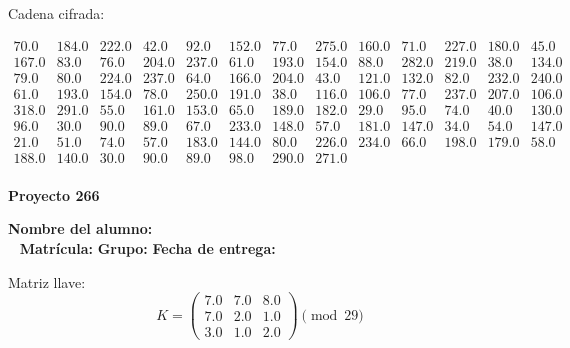 \documentclass[12pt]{article}
\begin{document}
Cadena cifrada:
\begin{center}
$\begin{array}{lllllllllllll}
70.0 & 184.0 & 222.0 & 42.0 & 92.0 & 152.0 & 77.0 & 275.0 & 160.0 & 71.0 & 227.0 & 180.0 & 45.0\\
167.0 & 83.0 & 76.0 & 204.0 & 237.0 & 61.0 & 193.0 & 154.0 & 88.0 & 282.0 & 219.0 & 38.0 & 134.0\\
79.0 & 80.0 & 224.0 & 237.0 & 64.0 & 166.0 & 204.0 & 43.0 & 121.0 & 132.0 & 82.0 & 232.0 & 240.0\\
61.0 & 193.0 & 154.0 & 78.0 & 250.0 & 191.0 & 38.0 & 116.0 & 106.0 & 77.0 & 237.0 & 207.0 & 106.0\\
318.0 & 291.0 & 55.0 & 161.0 & 153.0 & 65.0 & 189.0 & 182.0 & 29.0 & 95.0 & 74.0 & 40.0 & 130.0\\
96.0 & 30.0 & 90.0 & 89.0 & 67.0 & 233.0 & 148.0 & 57.0 & 181.0 & 147.0 & 34.0 & 54.0 & 147.0\\
21.0 & 51.0 & 74.0 & 57.0 & 183.0 & 144.0 & 80.0 & 226.0 & 234.0 & 66.0 & 198.0 & 179.0 & 58.0\\
188.0 & 140.0 & 30.0 & 90.0 & 89.0 & 98.0 & 290.0 & 271.0\\
\end{array}$
\end{center}

\newpage


\textbf{Proyecto 266}

\textbf{Nombre del alumno:} \underline{\hspace{13cm}}\\\
\vspace{1cm}
\textbf{Matrícula:} \underline{\hspace{4cm}} \hspace{1cm}
\textbf{Grupo:} \underline{\hspace{2cm}}
\textbf{Fecha de entrega:} \underline{\hspace{2cm}}

\medskip

Matriz llave:
\[
K = \begin{pmatrix}
7.0 & 7.0 & 8.0\\
7.0 & 2.0 & 1.0\\
3.0 & 1.0 & 2.0
\end{pmatrix} \pmod{29}
\]
\end{document}
